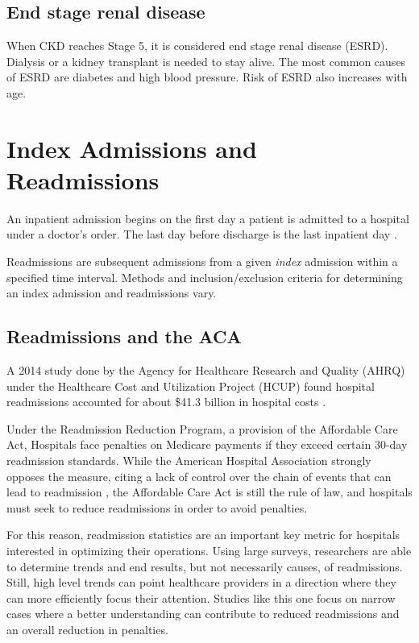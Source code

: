 \subsection{End stage renal disease}

When CKD reaches Stage 5, it is considered end stage renal disease (ESRD). Dialysis or a kidney transplant is needed to stay alive.
The most common causes of ESRD are diabetes and high blood pressure. Risk of ESRD also increases with age. 


\section{Index Admissions and Readmissions}

An inpatient admission begins on the first day a patient is admitted to a hospital under a doctor's order. The 
last day before discharge is the last inpatient day \cite{Medicare}.

Readmissions are subsequent admissions from a given \textit{index} admission within a specified time interval.
Methods and inclusion/exclusion criteria for determining an index admission and readmissions vary. 

\subsection{Readmissions and the ACA}

A 2014 study done by the Agency for Healthcare Research and Quality (AHRQ) under the Healthcare Cost and Utilization
Project (HCUP) found hospital readmissions accounted for about \$41.3 billion in hospital costs \cite{Hines2014}.

Under the Readmission Reduction Program, a provision of the Affordable Care Act, 
Hospitals face penalties on Medicare payments if they exceed certain 30-day readmission standards. While the 
American Hospital Association strongly opposes the measure, citing a lack of control over the chain of events
that can lead to readmission \cite{Rice2015, AHA2018}, the Affordable Care Act is still the rule of law, and hospitals must seek
to reduce readmissions in order to avoid penalties.

For this reason, readmission statistics are an important key metric for hospitals interested in optimizing 
their operations. Using large surveys, researchers are able to determine trends and end results, but not necessarily 
causes, of readmissions. Still, high level trends can point healthcare providers in a direction where they can
more efficiently focus their attention. Studies like this one focus on narrow cases where a better understanding can 
contribute to reduced readmissions and an overall reduction in penalties.

